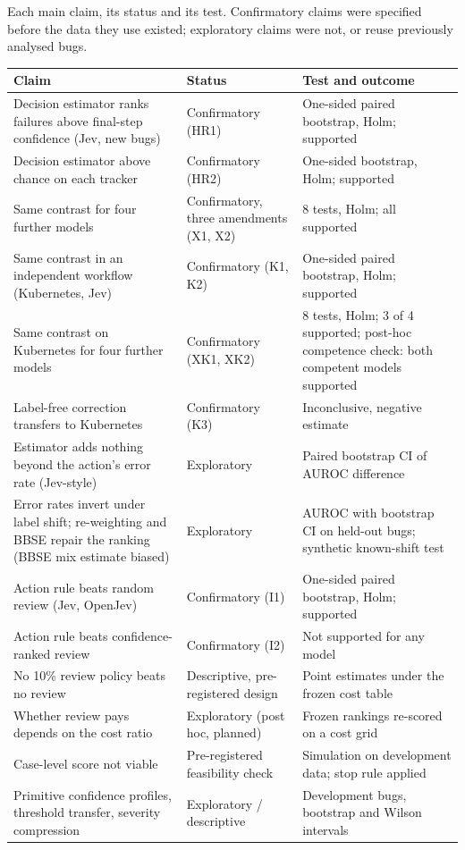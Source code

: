 \begin{widetable}
\centering
\caption{Each main claim, its status and its test. Confirmatory claims
were specified before the data they use existed; exploratory claims were
not, or reuse previously analysed bugs.}
\label{tab:claims}
\small
\begin{tabularx}{\linewidth}{Y l Y}
\toprule
Claim & Status & Test and outcome \\
\midrule
Decision estimator ranks failures above final-step confidence (Jev, new bugs) & Confirmatory (HR1) & One-sided paired bootstrap, Holm; supported \\ \addlinespace
Decision estimator above chance on each tracker & Confirmatory (HR2) & One-sided bootstrap, Holm; supported \\ \addlinespace
Same contrast for four further models & Confirmatory, three amendments (X1, X2) & 8 tests, Holm; all supported \\ \addlinespace
Same contrast in an independent workflow (Kubernetes, Jev) & Confirmatory (K1, K2) & One-sided paired bootstrap, Holm; supported \\ \addlinespace
Same contrast on Kubernetes for four further models & Confirmatory (XK1, XK2) & 8 tests, Holm; 3 of 4 supported; post-hoc competence check: both competent models supported \\ \addlinespace
Label-free correction transfers to Kubernetes & Confirmatory (K3) & Inconclusive, negative estimate \\ \addlinespace
Estimator adds nothing beyond the action's error rate (Jev-style) & Exploratory & Paired bootstrap CI of AUROC difference \\ \addlinespace
Error rates invert under label shift; re-weighting and BBSE repair the ranking (BBSE mix estimate biased) & Exploratory & AUROC with bootstrap CI on held-out bugs; synthetic known-shift test \\ \addlinespace
Action rule beats random review (Jev, OpenJev) & Confirmatory (I1) & One-sided paired bootstrap, Holm; supported \\ \addlinespace
Action rule beats confidence-ranked review & Confirmatory (I2) & Not supported for any model \\ \addlinespace
No 10\% review policy beats no review & Descriptive, pre-registered design & Point estimates under the frozen cost table \\ \addlinespace
Whether review pays depends on the cost ratio & Exploratory (post hoc, planned) & Frozen rankings re-scored on a cost grid \\ \addlinespace
Case-level score not viable & Pre-registered feasibility check & Simulation on development data; stop rule applied \\ \addlinespace
Primitive confidence profiles, threshold transfer, severity compression & Exploratory / descriptive & Development bugs, bootstrap and Wilson intervals \\
\bottomrule
\end{tabularx}
\end{widetable}
